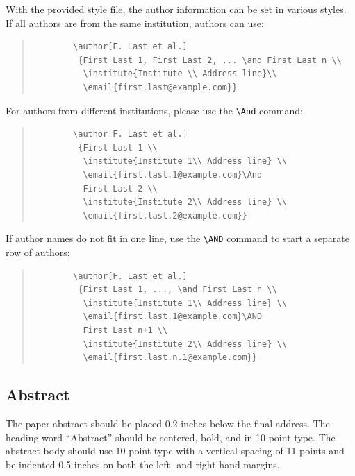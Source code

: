 \documentclass{article}
\begin{document}
With the provided style file, the author information can be set in various styles.
If all authors are from the same institution, authors can use:
\begin{quote}
	\begin{verbatim}
		\author[F. Last et al.]
		 {First Last 1, First Last 2, ... \and First Last n \\
		  \institute{Institute \\ Address line}\\
		  \email{first.last@example.com}}
	\end{verbatim}
\end{quote}
For authors from different institutions, please use the \verb+\And+ command:
\begin{quote}
	\begin{verbatim}
		\author[F. Last et al.]
		 {First Last 1 \\
		  \institute{Institute 1\\ Address line} \\
		  \email{first.last.1@example.com}\And
		  First Last 2 \\
		  \institute{Institute 2\\ Address line} \\
		  \email{first.last.2@example.com}}
	\end{verbatim}
\end{quote}
If author names do not fit in one line, use the \verb+\AND+ command to start a separate row of authors:
\begin{quote}
	\begin{verbatim}
		\author[F. Last et al.]
		 {First Last 1, ..., \and First Last n \\
		  \institute{Institute 1\\ Address line} \\
		  \email{first.last.1@example.com}\AND
		  First Last n+1 \\
		  \institute{Institute 2\\ Address line} \\
		  \email{first.last.n.1@example.com}}
	\end{verbatim}
\end{quote}

\subsection{Abstract}

The paper abstract should be placed 0.2 inches below the final address.
The heading word ``Abstract'' should be centered, bold, and in 10-point type.
The abstract body should use 10-point type with a vertical spacing of 11 points and be indented 0.5 inches on both the left- and right-hand margins.
\end{document}
